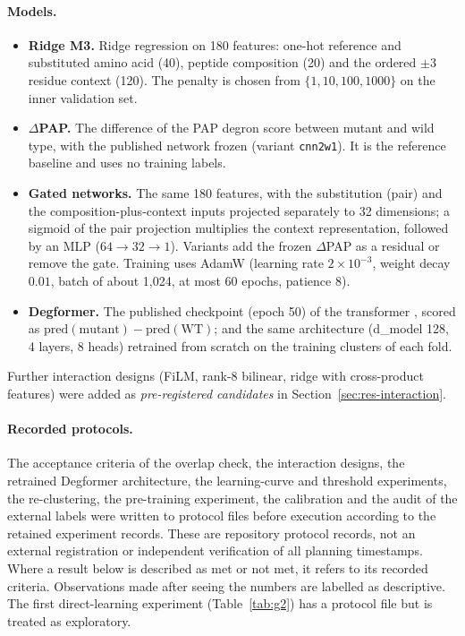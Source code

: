 \paragraph{Models.}
\begin{itemize}
  \item \textbf{Ridge M3.} Ridge regression \citep{hoerl1970} on 180 features: one-hot reference and
        substituted amino acid (40), peptide composition (20) and the ordered $\pm 3$ residue context (120).
        The penalty is chosen from $\{1,10,100,1000\}$ on the inner validation set.
  \item \textbf{$\Delta$PAP.} The difference of the PAP degron score \citep{voutsinos2026} between mutant and
        wild type, with the published network frozen (variant \texttt{cnn2w1}). It is the reference
        baseline and uses no training labels.
  \item \textbf{Gated networks.} The same 180 features, with the substitution (pair) and the
        composition-plus-context inputs projected separately to 32 dimensions; a sigmoid of the pair projection
        multiplies the context representation, followed by an MLP ($64\to32\to1$). Variants add the frozen
        $\Delta$PAP as a residual or remove the gate. Training uses AdamW (learning rate $2\times10^{-3}$,
        weight decay $0.01$, batch of about 1,024, at most 60 epochs, patience 8).
  \item \textbf{Degformer.} The published checkpoint (epoch 50) of the transformer \citep{degformer}, scored as
        $\mathrm{pred}(\mathrm{mutant})-\mathrm{pred}(\mathrm{WT})$; and the same architecture
        (d\_model 128, 4 layers, 8 heads) retrained from scratch on the training clusters of each fold.
\end{itemize}
Further interaction designs (FiLM, rank-8 bilinear, ridge with cross-product features) were added as
\emph{pre-registered candidates} in Section~\ref{sec:res-interaction}.

\paragraph{Recorded protocols.}
The acceptance criteria of the overlap check, the interaction designs, the retrained Degformer architecture, the
learning-curve and threshold experiments, the re-clustering, the pre-training experiment, the calibration and
the audit of the external labels were written to protocol files before execution according to the retained
experiment records. These are repository protocol records, not an external registration or independent
verification of all planning timestamps. Where a result below is described as met or not met, it refers
to its recorded criteria.
Observations made after seeing the numbers are labelled as descriptive. The first direct-learning experiment
(Table~\ref{tab:g2}) has a protocol file but is treated as exploratory.

